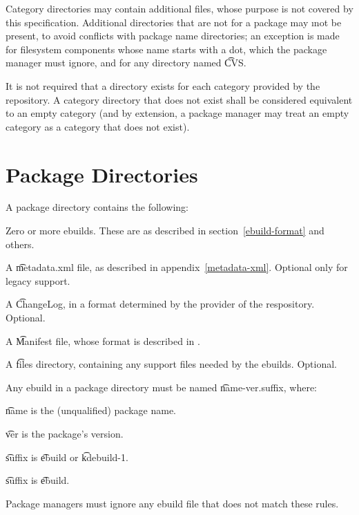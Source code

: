 Category directories may contain additional files, whose purpose is not covered by this
specification. Additional directories that are not for a package may \i{not} be present, to avoid
conflicts with package name directories; an exception is made for filesystem components whose name
starts with a dot, which the package manager must ignore, and for any directory named \t{CVS}.

It is not required that a directory exists for each category provided by the repository. A category
directory that does not exist shall be considered equivalent to an empty category (and by extension,
a package manager may treat an empty category as a category that does not exist).

\section{Package Directories}
\label{package-dirs}

A package directory contains the following:
\begin{compactitem}
\item Zero or more ebuilds. These are as described in section~\ref{ebuild-format} and others.
\item A \t{metadata.xml} file, as described in appendix~\ref{metadata-xml}\@. Optional only for
    legacy support.
\item A \t{ChangeLog}, in a format determined by the provider of the respository. Optional.
\item A \t{Manifest} file, whose format is described in \cite{Glep44}.
\item A \t{files} directory, containing any support files needed by the ebuilds. Optional.
\end{compactitem}

Any ebuild in a package directory must be named \t{name-ver.suffix}, where:

\begin{compactitem}
\item \t{name} is the (unqualified) package name.
\item \t{ver} is the package's version.
\IFKDEBUILDELSE
{
    \item \label{file-extension} \t{suffix} is \t{ebuild} or \t{kdebuild-1}.
}{
    \item \label{file-extension} \t{suffix} is \t{ebuild}.
}
\end{compactitem}

Package managers must ignore any ebuild file that does not match these rules.

